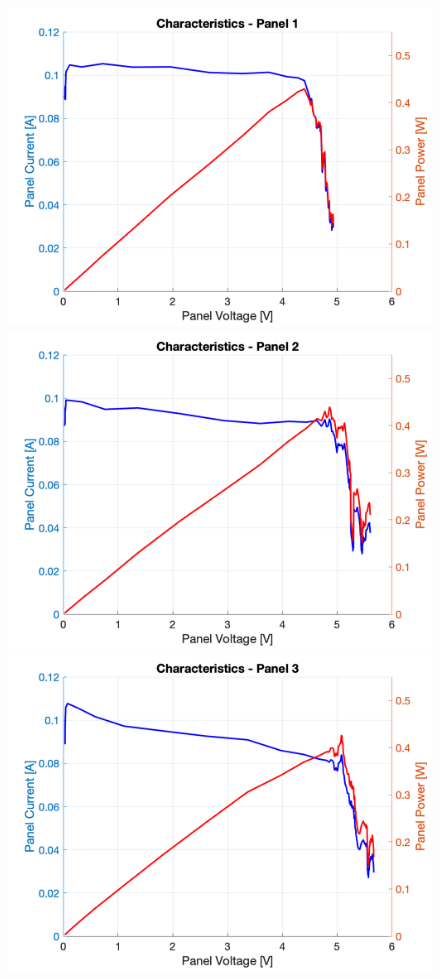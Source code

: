 \documentclass[a4paper]{article}
\begin{document}
\begin{figure}[H]
    \centering
    \includegraphics[scale=0.18]{Panel1.png}
    \includegraphics[scale=0.18]{Panel2.png}
    \includegraphics[scale=0.18]{Panel3.png}

\end{figure}
\end{document}
